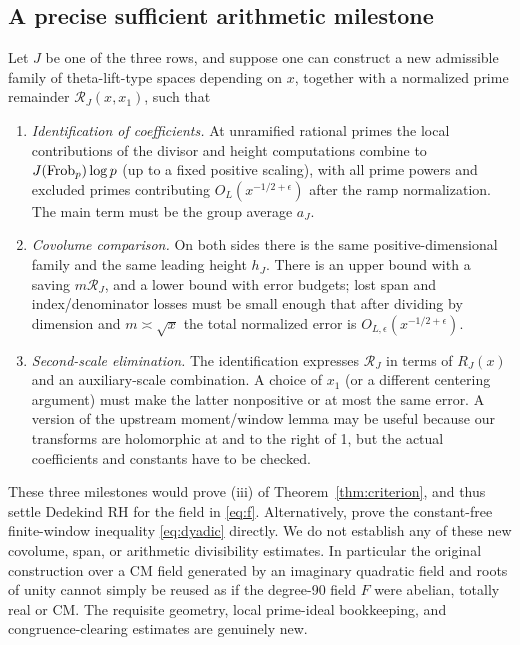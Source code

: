 \documentclass[11pt,letterpaper]{article}
\theoremstyle{remark}\newtheorem{remark}[theorem]{Remark}
\begin{document}
\subsection{A precise sufficient arithmetic milestone}
Let $J$ be one of the three rows, and suppose one can construct a new admissible family of theta-lift-type spaces depending on $x$, together with a normalized prime remainder $\mathcal R_J(x,x_1)$, such that
\begin{enumerate}[label=\arabic*.]
\item \emph{Identification of coefficients.} At unramified rational primes the local contributions of the divisor and height computations combine to $J(\operatorname{Frob}_p)\log p$ (up to a fixed positive scaling), with all prime powers and excluded primes contributing $O_L(x^{-1/2+\epsilon})$ after the ramp normalization. The main term must be the group average $a_J$.
\item \emph{Covolume comparison.} On both sides there is the same positive-dimensional family and the same leading height $h_J$. There is an upper bound with a saving $m\mathcal R_J$, and a lower bound with error budgets; lost span and index/denominator losses must be small enough that after dividing by dimension and $m\asymp\sqrt x$ the total normalized error is $O_{L,\epsilon}(x^{-1/2+\epsilon})$.
\item \emph{Second-scale elimination.} The identification expresses $\mathcal R_J$ in terms of $R_J(x)$ and an auxiliary-scale combination. A choice of $x_1$ (or a different centering argument) must make the latter nonpositive or at most the same error. A version of the upstream moment/window lemma may be useful because our transforms are holomorphic at and to the right of 1, but the actual coefficients and constants have to be checked.
\end{enumerate}
These three milestones would prove (iii) of Theorem~\ref{thm:criterion}, and thus settle Dedekind RH for the field in \eqref{eq:f}. Alternatively, prove the constant-free finite-window inequality \eqref{eq:dyadic} directly. We do not establish any of these new covolume, span, or arithmetic divisibility estimates. In particular the original construction over a CM field generated by an imaginary quadratic field and roots of unity cannot simply be reused as if the degree-90 field $F$ were abelian, totally real or CM. The requisite geometry, local prime-ideal bookkeeping, and congruence-clearing estimates are genuinely new.
\end{document}
